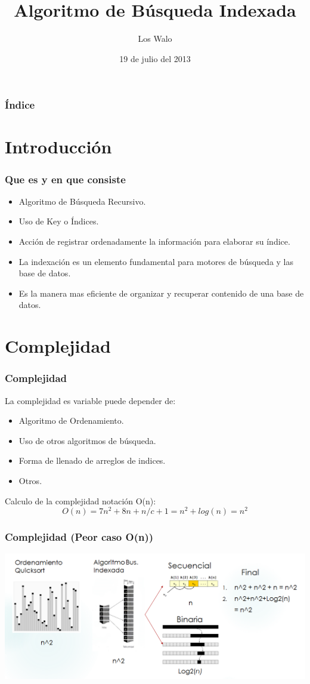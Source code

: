 \documentclass[hyperref={pdfpagelabels=false}]{beamer}
\title{Algoritmo de B\'usqueda Indexada}
\author{Los Walo}
\date{19 de julio del 2013}
\begin{document}
\begin{frame}
\titlepage %
\end{frame} 

\begin{frame}
\frametitle{\'Indice}
\tableofcontents
\end{frame} 


\section{Introducci\'on} 
\begin{frame}
\frametitle{Que es y en que consiste}
 \begin{itemize}
\item Algoritmo de B\'usqueda Recursivo.\\
\item Uso de Key o \'Indices.\\
\item Acci\'on de registrar ordenadamente la informaci\'on para elaborar su \'indice.\\
\item La indexaci\'on es un elemento fundamental para motores de b\'usqueda y las base de datos.\\
\item Es la manera mas eficiente de organizar y recuperar contenido de una base de datos.
\end{itemize}
\end{frame}


\section{Complejidad}
\begin{frame}
\frametitle{Complejidad} 
La complejidad es variable puede depender de:
\begin{itemize}
\item Algoritmo de Ordenamiento.
\item Uso de otros algoritmos de b\'usqueda. 
\item Forma de llenado de arreglos de indices.
\item Otros.
\end{itemize}
Calculo de la complejidad notaci\'on O(n):\\
\[
O(n)=7n^2+8n+n/c+1=n^2+log(n)=n^2
\]
\end{frame}

\begin{frame}
\frametitle{Complejidad (Peor caso O(n))}
\includegraphics[width=1.1\textwidth]{casoPeor.png}
\end{frame}
\end{document}
